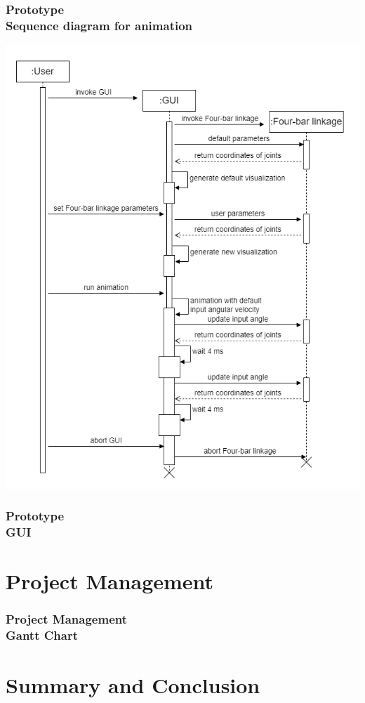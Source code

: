 \documentclass[ucs,10pt]{beamer}
\begin{document}
\begin{frame}
\frametitle{Prototype \\
    \small \color{rwth-blue} Sequence diagram for animation}
    \begin{center}
        \includegraphics[width=0.5\linewidth]{Used_Picture/sequence_diagramm_animation.png}
    \end{center}
\end{frame}

\begin{frame}
\frametitle{Prototype \\
    \small \color{rwth-blue} GUI}

\end{frame}


\section{Project Management}

\begin{frame}
\frametitle{Project Management \\
    \small \color{rwth-blue} Gantt Chart}
\end{frame}


\section{Summary and Conclusion}
\end{document}

